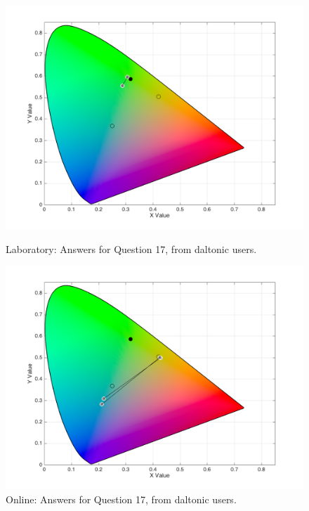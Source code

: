 \begin{figure}[!htbp]
  \centering
  \begin{minipage}{0.48\textwidth}
    \centering
    \includegraphics[width=\textwidth]{images/results/17_lab_daltonicUsers.png}
    \caption[Laboratory: Answers for Question 17, from daltonic users.]{Laboratory: Answers for Question 17, from daltonic users.}
    \label{fig:dalt_3}
  \end{minipage}\hfill
  \begin{minipage}{0.48\textwidth}
    \centering
    \includegraphics[width=\textwidth]{images/results/17_online_daltonicUsers.png}
    \caption[Online: Answers for Question 17, from daltonic users.]{Online: Answers for Question 17, from daltonic users.}
    \label{fig:dalt_4}
  \end{minipage}
\end{figure} \\ \par
